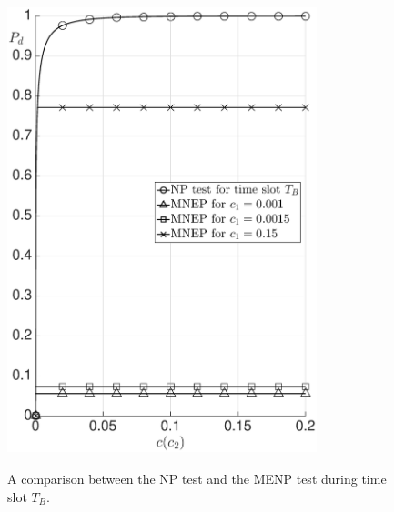 \documentclass[12pt,journal,a4paper,twoside,onecolumn]{IEEEtran}
\begin{document}
\begin{spacing}{2}
\begin{figure}[!h]
\begin{floatrow}
{             \includegraphics[width=9cm, height=13cm]{5/SIb.eps}}
             {\caption{A comparison between the NP test and the MENP test during time slot $T_B$.}
              \label{pic:20150704a0}
             }
           \end{floatrow}
\end{figure}


\end{spacing}
\end{document}
